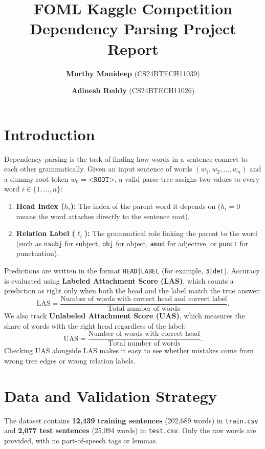 \documentclass[11pt,a4paper]{article}
\title{\textbf{FOML Kaggle Competition}\\[0.25em]
\large Dependency Parsing Project Report}
\author{
    \textbf{Murthy Manideep} (CS24BTECH11039) \and
    \textbf{Adinesh Reddy} (CS24BTECH11026)
}
\date{}
\begin{document}
\maketitle

\section{Introduction}

Dependency parsing is the task of finding how words in a sentence connect to each other grammatically. Given an input sentence of words $(w_1, w_2, \dots, w_n)$ and a dummy root token $w_0 = \texttt{<ROOT>}$, a valid parse tree assigns two values to every word $i \in \{1, \dots, n\}$:
\begin{enumerate}[noitemsep]
    \item \textbf{Head Index ($h_i$):} The index of the parent word it depends on ($h_i = 0$ means the word attaches directly to the sentence root).
    \item \textbf{Relation Label ($\ell_i$):} The grammatical role linking the parent to the word (such as \texttt{nsubj} for subject, \texttt{obj} for object, \texttt{amod} for adjective, or \texttt{punct} for punctuation).
\end{enumerate}

Predictions are written in the format \texttt{HEAD|LABEL} (for example, \texttt{3|det}). Accuracy is evaluated using \textbf{Labeled Attachment Score (LAS)}, which counts a prediction as right only when both the head and the label match the true answer:
\begin{equation}
\text{LAS} = \frac{\text{Number of words with correct head and correct label}}{\text{Total number of words}}.
\end{equation}
We also track \textbf{Unlabeled Attachment Score (UAS)}, which measures the share of words with the right head regardless of the label:
\begin{equation}
\text{UAS} = \frac{\text{Number of words with correct head}}{\text{Total number of words}}.
\end{equation}
Checking UAS alongside LAS makes it easy to see whether mistakes come from wrong tree edges or wrong relation labels.

\section{Data and Validation Strategy}

The dataset contains \textbf{12,439 training sentences} (202,689 words) in \texttt{train.csv} and \textbf{2,077 test sentences} (25,094 words) in \texttt{test.csv}. Only the raw words are provided, with no part-of-speech tags or lemmas.
\end{document}
